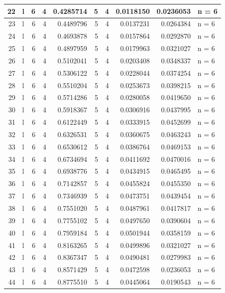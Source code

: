 \documentclass[
  letterpaper,
  DIV=11,
  numbers=noendperiod]{scrreprt}
\begin{document}
\begin{table}
\begin{tabular}[t]{r|l|r|r|r|r|r|r|r|l}
\hline
22 & l & 6 & 4 & 0.4285714 & 5 & 4 & 0.0118150 & 0.0236053 & n = 6\\
\hline
23 & l & 6 & 4 & 0.4489796 & 5 & 4 & 0.0137231 & 0.0264384 & n = 6\\
\hline
24 & l & 6 & 4 & 0.4693878 & 5 & 4 & 0.0157864 & 0.0292870 & n = 6\\
\hline
25 & l & 6 & 4 & 0.4897959 & 5 & 4 & 0.0179963 & 0.0321027 & n = 6\\
\hline
26 & l & 6 & 4 & 0.5102041 & 5 & 4 & 0.0203408 & 0.0348337 & n = 6\\
\hline
27 & l & 6 & 4 & 0.5306122 & 5 & 4 & 0.0228044 & 0.0374254 & n = 6\\
\hline
28 & l & 6 & 4 & 0.5510204 & 5 & 4 & 0.0253673 & 0.0398215 & n = 6\\
\hline
29 & l & 6 & 4 & 0.5714286 & 5 & 4 & 0.0280058 & 0.0419650 & n = 6\\
\hline
30 & l & 6 & 4 & 0.5918367 & 5 & 4 & 0.0306916 & 0.0437995 & n = 6\\
\hline
31 & l & 6 & 4 & 0.6122449 & 5 & 4 & 0.0333915 & 0.0452699 & n = 6\\
\hline
32 & l & 6 & 4 & 0.6326531 & 5 & 4 & 0.0360675 & 0.0463243 & n = 6\\
\hline
33 & l & 6 & 4 & 0.6530612 & 5 & 4 & 0.0386764 & 0.0469153 & n = 6\\
\hline
34 & l & 6 & 4 & 0.6734694 & 5 & 4 & 0.0411692 & 0.0470016 & n = 6\\
\hline
35 & l & 6 & 4 & 0.6938776 & 5 & 4 & 0.0434915 & 0.0465495 & n = 6\\
\hline
36 & l & 6 & 4 & 0.7142857 & 5 & 4 & 0.0455824 & 0.0455350 & n = 6\\
\hline
37 & l & 6 & 4 & 0.7346939 & 5 & 4 & 0.0473751 & 0.0439454 & n = 6\\
\hline
38 & l & 6 & 4 & 0.7551020 & 5 & 4 & 0.0487961 & 0.0417817 & n = 6\\
\hline
39 & l & 6 & 4 & 0.7755102 & 5 & 4 & 0.0497650 & 0.0390604 & n = 6\\
\hline
40 & l & 6 & 4 & 0.7959184 & 5 & 4 & 0.0501944 & 0.0358159 & n = 6\\
\hline
41 & l & 6 & 4 & 0.8163265 & 5 & 4 & 0.0499896 & 0.0321027 & n = 6\\
\hline
42 & l & 6 & 4 & 0.8367347 & 5 & 4 & 0.0490481 & 0.0279983 & n = 6\\
\hline
43 & l & 6 & 4 & 0.8571429 & 5 & 4 & 0.0472598 & 0.0236053 & n = 6\\
\hline
44 & l & 6 & 4 & 0.8775510 & 5 & 4 & 0.0445064 & 0.0190543 & n = 6\\

\end{tabular}
\end{table}
\end{document}

